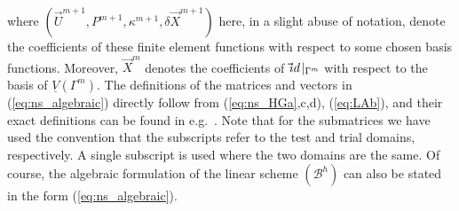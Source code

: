 \documentclass[a4paper,12pt,onecolumn]{article}
\newcommand{\Vh}{\underline{V}(\Gamma^m)}
\newcommand{\id}{\rm id}
\newcommand{\schemeB}{{\mathcal{B}^h}}
\begin{document}
where $(\vec U^{m+1},P^{m+1},\kappa^{m+1},\delta\vec X^{m+1})$ here,
in a slight abuse of notation, denote the
coefficients of these finite element functions with respect to some chosen
basis functions.
Moreover, $\vec X^m$ denotes the coefficients of
$\vec\id\!\mid_{\Gamma^m}$ with respect to the basis of $\Vh$. The definitions
of the matrices and vectors in (\ref{eq:ns_algebraic}) directly follow from
(\ref{eq:ns_HGa},c,d), (\ref{eq:LAb}),
and their exact definitions can be found in e.g.\ \cite[\S5.5]{Agnese}.
Note that
for the submatrices we have used the convention that the subscripts refer to
the test and trial domains, respectively. A single subscript is used where the
two domains are the same.
Of course, the algebraic formulation of the linear scheme
$(\schemeB)$ can also be stated in the form (\ref{eq:ns_algebraic}).
\end{document}
